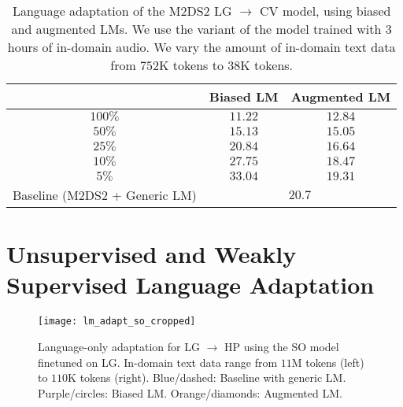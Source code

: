 \documentclass[journal]{IEEEtran}
\begin{document}
\begin{table}
    \centering
        \caption{\label{tab:m2ds2-lm}Language adaptation of the M2DS2 LG $\rightarrow$ CV model, using biased and augmented LMs. We use the variant of the model trained with $3$ hours of in-domain audio. We vary the amount of in-domain text data from $752$K tokens to $38$K tokens.}
    \begin{tabular}{c|cc}
    \toprule
         & Biased LM & Augmented LM  \\
        \midrule
        $100\%$ & $11.22$ & $12.84$ \\
         $50\%$	& $15.13$ & $15.05$ \\
        $25\%$ &	$20.84$ &	$16.64$ \\
        $10\%$ &	$27.75$	& $18.47$ \\
        $5\%$	& $33.04$ &	$19.31$ \\
        \midrule
        Baseline (M2DS2 + Generic LM) & \multicolumn{2}{c}{$20.7$}\\
        \bottomrule
    \end{tabular}

\end{table}

\section{Unsupervised and Weakly Supervised Language Adaptation}

\label{sec:weak}

\begin{figure}
    \centering
    \texttt{[image: lm\_adapt\_so\_cropped]}
    \caption{Language-only adaptation for LG $\rightarrow$ HP using the SO model finetuned on LG. In-domain text data range from $11$M tokens (left) to $110$K tokens (right). Blue/dashed: Baseline with generic LM. Purple/circles: Biased LM. Orange/diamonds: Augmented LM.}
    \label{fig:so-lm}
\end{figure}
\end{document}

